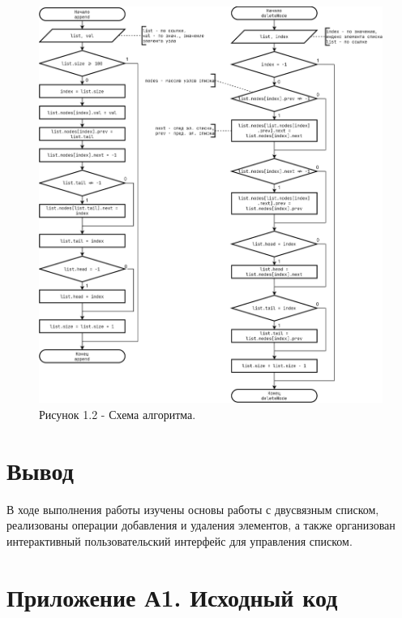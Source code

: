 \documentclass[oneside,a4paper,14pt]{extarticle}
\begin{document}
\begin{figure}[!ht]
	\centering
	\includegraphics[height=0.9\textheight]{pics/flowchart_p2.png}
	\caption*{Рисунок 1.2 - Схема алгоритма.}
\end{figure}

\section*{Вывод}

В ходе выполнения работы изучены основы работы с двусвязным списком, реализованы операции добавления и удаления элементов, а также организован интерактивный пользовательский интерфейс для управления списком.

\newpage
\section*{Приложение А1. Исходный код}

\end{document}
